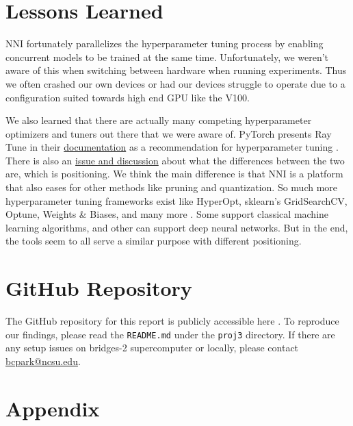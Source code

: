 \documentclass{article}
\begin{document}
\section{Lessons Learned}
NNI fortunately parallelizes the hyperparameter tuning process by enabling concurrent models to be trained at the same time. Unfortunately, we weren't aware of this when switching between hardware when running experiments. Thus we often crashed our own devices or had our devices struggle to operate due to a configuration suited towards high end GPU like the V100. 

We also learned that there are actually many competing hyperparameter optimizers and tuners out there that we were aware of. PyTorch presents Ray Tune in their \href{https://pytorch.org/tutorials/beginner/hyperparameter_tuning_tutorial.html}{documentation} as a recommendation for hyperparameter tuning \cite{ray-tune}. There is also an \href{https://github.com/microsoft/nni/issues/1743}{issue and discussion} about what the differences between the two are, which is positioning. We think the main difference is that NNI is a platform that also eases for other methods like pruning and quantization. So much more hyperparameter tuning frameworks exist like HyperOpt, sklearn's GridSearchCV, Optune, Weights \& Biases, and many more \cite{hyperopt, sklearn_api, optuna}. Some support classical machine learning algorithms, and other can support deep neural networks. But in the end, the tools seem to all serve a similar purpose with different positioning.

\section{GitHub Repository}
The GitHub repository for this report is publicly accessible here \cite{proj3-repo}. To reproduce our findings, please read the \verb|README.md| under the \verb|proj3| directory. If there are any setup issues on bridges-2 supercomputer or locally, please contact \href{mailto:bcpark@ncsu.edu}{bcpark@ncsu.edu}.




\newpage
\section{Appendix}
\end{document}
